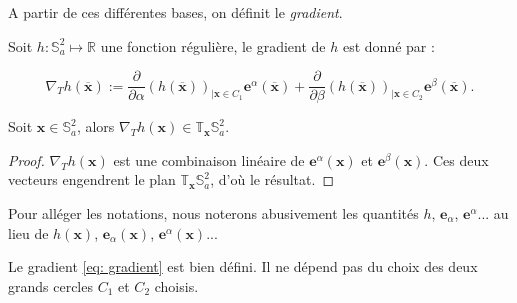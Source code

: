 A partir de ces différentes bases, on définit le \textit{gradient}.

\begin{definition}
Soit $h : \mathbb{S}_a^2 \mapsto \mathbb{R}$ une fonction régulière, le gradient de $h$ est donné par :

\begin{equation}
\nabla_{T} h(\overline{\mathbf{x}}) := \dfrac{\partial}{\partial \alpha} \left( h(\overline{\mathbf{x}}) \right)_{| \mathbf{x} \in C_1} \mathbf{e}^{\alpha}(\overline{\mathbf{x}}) + \dfrac{\partial}{\partial \beta}\left(  h(\overline{\mathbf{x}}) \right)_{| \mathbf{x} \in C_2} \mathbf{e}^{\beta}(\overline{\mathbf{x}}).
\label{eq: gradient}
\end{equation}
\end{definition}

\begin{proposition}
Soit $\mathbf{x} \in \mathbb{S}_a^2$, alors $\nabla_{T} h (\mathbf{x}) \in \mathbb{T}_{\mathbf{x}} \mathbb{S}_a^2$.
\end{proposition}

\begin{proof}
$\nabla_{T} h (\mathbf{x})$ est une combinaison linéaire de $\mathbf{e}^{\alpha}(\mathbf{x})$ et $\mathbf{e}^{\beta}(\mathbf{x})$. Ces deux vecteurs engendrent le plan $\mathbb{T}_{\mathbf{x}}\mathbb{S}_a^2$, d'où le résultat.
\end{proof}

Pour alléger les notations, nous noterons abusivement les quantités $h$, $\mathbf{e}_{\alpha}$, $\mathbf{e}^{\alpha}$... au lieu de $h(\mathbf{x})$, $\mathbf{e}_{\alpha}(\mathbf{x})$, $\mathbf{e}^{\alpha}(\mathbf{x})$...

\begin{proposition}
Le gradient \eqref{eq: gradient} est bien défini. Il ne dépend pas du choix des deux grands cercles $C_1$ et $C_2$ choisis.
\end{proposition}

